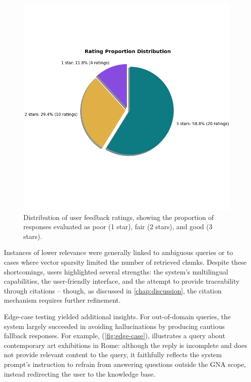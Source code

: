 \begin{spacing}{1.5}
\begin{figure}[H]
  \centering
  \includegraphics[width=\textwidth]{images/rating_proportions.png} 
  \caption{Distribution of user feedback ratings, showing the proportion of responses evaluated as poor (1 star), fair (2 stars), and good (3 stars).}
  \label{fig:ratings_}
\end{figure}

Instances of lower relevance were generally linked to ambiguous queries or to cases where vector sparsity limited the number of retrieved chunks. Despite these shortcomings, users highlighted several strengths: the system’s multilingual capabilities, the user-friendly interface, and the attempt to provide traceability through citations -- though, as discussed in \autoref{chap:discussion}, the citation mechanism requires further refinement.

Edge-case testing yielded additional insights. For out-of-domain queries, the system largely succeeded in avoiding hallucinations by producing cautious fallback responses. For example, (\autoref{fig:edge-case}), illustrates a query about contemporary art exhibitions in Rome: although the reply is incomplete and does not provide relevant content to the query, it faithfully reflects the system prompt’s instruction to refrain from answering questions outside the GNA scope, instead redirecting the user to the knowledge base.


\end{spacing}
